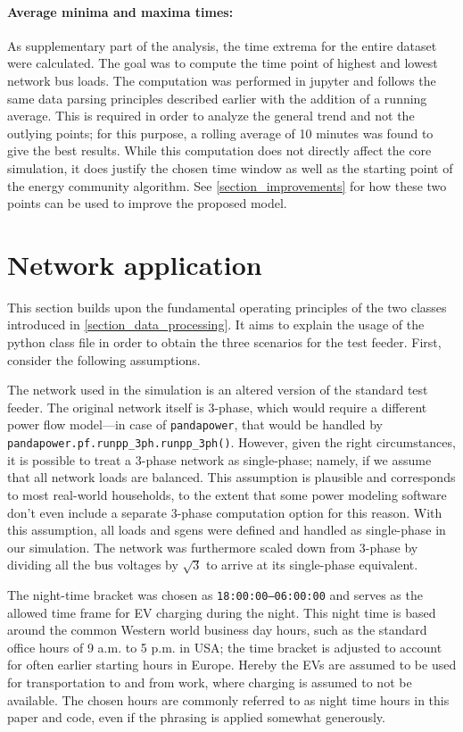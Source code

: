\documentclass[a4paper,10pt]{report}
\begin{document}
\paragraph{Average minima and maxima times:} As supplementary part of the analysis, the time extrema for the entire dataset were calculated. The goal was to compute the time point of highest and lowest network bus loads. The computation was performed in jupyter and follows the same data parsing principles described earlier with the addition of a running average. This is required in order to analyze the general trend and not the outlying points; for this purpose, a rolling average of 10 minutes was found to give the best results. While this computation does not directly affect the core simulation, it does justify the chosen time window as well as the starting point of the energy community algorithm. See \cref{section_improvements} for how these two points can be used to improve the proposed model.

\newpage
\section{Network application}\label{section_network_application}
This section builds upon the fundamental operating principles of the two classes introduced in \cref{section_data_processing}. It aims to explain the usage of the python class file in order to obtain the three scenarios for the test feeder. First, consider the following assumptions.

The network used in the simulation is an altered version of the standard test feeder. The original network itself is 3-phase, which would require a different power flow model---in case of \texttt{pandapower}, that would be handled by \texttt{pandapower.pf.runpp\_3ph.runpp\_3ph()}. However, given the right circumstances, it is possible to treat a 3-phase network as single-phase; namely, if we assume that all network loads are balanced. This assumption is plausible and corresponds to most real-world households, to the extent that some power modeling software don't even include a separate 3-phase computation option for this reason. With this assumption, all loads and sgens were defined and handled as single-phase in our simulation. The network was furthermore scaled down from 3-phase by dividing all the bus voltages by $\sqrt{3}$ to arrive at its single-phase equivalent.

The night-time bracket was chosen as \texttt{18:00:00--06:00:00} and serves as the allowed time frame for EV charging during the night. This night time is based around the common Western world business day hours, such as the standard office hours of 9 a.m. to 5 p.m. in USA; the time bracket is adjusted to account for often earlier starting hours in Europe. Hereby the EVs are assumed to be used for transportation to and from work, where charging is assumed to not be available. The chosen hours are commonly referred to as night time hours in this paper and code, even if the phrasing is applied somewhat generously.
\end{document}
